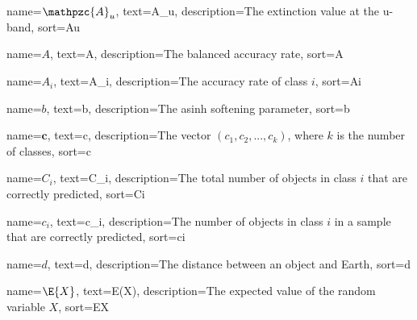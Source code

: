 

\providecommand\given{}
\DeclarePairedDelimiterXPP\E[1]{\mathbb{E}}{[}{]}{}{
	\renewcommand\given{  \nonscript\:
		\delimsize\vert
		\nonscript\:
		\mathopen{}
		\allowbreak}
	#1
}
\DeclarePairedDelimiterXPP\Prob[1]{\mathbb{P}}{(}{)}{}{
	\renewcommand\given{  \nonscript\:
		\delimsize\vert
		\nonscript\:
		\mathopen{}
		\allowbreak}
	#1
}
\DeclareMathOperator{\Beta}{Beta}
\DeclareMathOperator{\Bin}{Bin}
\DeclareMathOperator{\arsinh}{arsinh}
\newcommand{\A}{\mathpzc{A}}
\newcommand{\X}{\mathcal{X}}
\newcommand{\Y}{\mathcal{Y}}
\newcommand{\Unlabelled}{\mathcal{U}}
\newcommand{\Labelled}{\mathcal{L}}
\newcommand{\R}{\mathcal{R}}
\newcommand*{\argmin}{\operatornamewithlimits{argmin}\limits}
\newcommand*{\argmax}{\operatornamewithlimits{argmax}\limits}

%
{%
	name={$\A_u$},
	text={A_u},
	description={The extinction value at the u-band},
	sort={Au}
}

%
{%
	name={$A$},
	text={A},
	description={The balanced accuracy rate},
	sort={A}
}

%
{%
	name={$A_i$},
	text={A_i},
	description={The accuracy rate of class $i$},
	sort={Ai}
}

%
{%
	name={$b$},
	text={b},
	description={The asinh softening parameter},
	sort={b}
}

%
{%
	name={$\bm{c}$},
	text={c},
	description={The vector $(c_1, c_2,...,c_k)$, where $k$ is the number of classes},
	sort={c}
}

%
{%
	name={$C_i$},
	text={C_i},
	description={The total number of objects in class $i$ that are correctly predicted},
	sort={Ci}
}

%
{%
	name={$c_i$},
	text={c_i},
	description={The number of objects in class $i$ in a sample that are correctly predicted},
	sort={ci}
}

%
{%
	name={$d$},
	text={d},
	description={The distance between an object and Earth},
	sort={d}
}

%
{%
	name={$\E{X}$},
	text={E(X)},
	description={The expected value of the random variable $X$},
	sort={EX}
}

